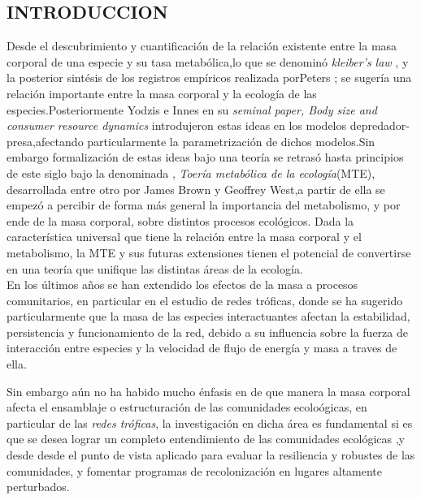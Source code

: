 \subsection{INTRODUCCION}

Desde el descubrimiento y cuantificaci\'on de la relaci\'on existente entre la masa corporal de una especie y su tasa metab\'olica,lo que se denomin\'o \emph{kleiber's law} \citep{kleiber1961fire}, y la posterior sint\'esis de los registros emp\'iricos realizada porPeters \citep{peters1986ecological}; se suger\'ia una relaci\'on importante entre la masa corporal y la ecolog\'ia de las especies.Posteriormente Yodzis e Innes en su \emph{seminal paper, Body size and consumer resource dynamics}\citep{yodzis1992body} introdujeron estas ideas en los modelos depredador-presa,afectando particularmente la parametrizaci\'on de dichos modelos.Sin embargo formalizaci\'on de estas ideas bajo una teor\'ia se retras\'o hasta principios de este siglo bajo la denominada , \emph{Toer\'ia metab\'olica de la ecolog\'ia}(MTE), desarrollada entre otro por James Brown y Geoffrey West\citep{brown2004toward},a partir de ella se empez\'o a percibir de forma m\'as general la importancia del metabolismo, y por ende de la masa corporal, sobre distintos procesos ecol\'ogicos. Dada la caracter\'istica universal que tiene la relaci\'on entre la masa corporal y el metabolismo, la MTE y sus futuras extensiones tienen el potencial de convertirse en una teor\'ia que unifique las distintas \'areas de la ecolog\'ia.\\
En los \'ultimos a\~nos se han extendido los efectos de la masa a procesos comunitarios, en particular en el estudio de redes tr\'oficas, donde se ha sugerido particularmente que la masa de las especies interactuantes afectan la estabilidad, persistencia y funcionamiento de la red, debido a su influencia sobre la fuerza de interacci\'on entre especies y la velocidad de flujo de energ\'ia y masa a traves de ella. \citep{varios, citar luego}

Sin embargo a\'un no ha habido mucho \'enfasis en de que manera la masa corporal afecta el ensamblaje o estructuraci\'on de las comunidades ecolo\'ogicas, en particular de las \emph{redes tr\'oficas}, la investigaci\'on en dicha \'area es fundamental si es que se desea lograr un completo entendimiento de las comunidades ecol\'ogicas ,y desde desde el punto de vista aplicado para evaluar la resiliencia y robustes de las comunidades, y fomentar programas de recolonizaci\'on en lugares altamente perturbados.\\

